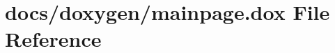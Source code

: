 \hypertarget{mainpage_8dox}{}\section{docs/doxygen/mainpage.dox File Reference}
\label{mainpage_8dox}
